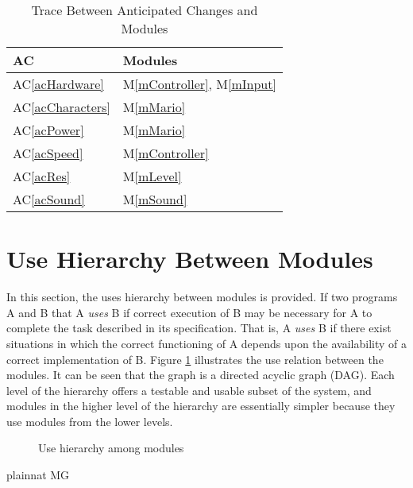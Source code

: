 \documentclass[12pt, titlepage]{article}
\newcommand{\acref}[1]{AC\ref{#1}}
\newcommand{\mref}[1]{M\ref{#1}}
\begin{document}
\begin{table}[H]
\centering
\begin{tabular}{p{} p{}}
\toprule
\textbf{AC} & \textbf{Modules}\\
\midrule
\acref{acHardware} & \mref{mController}, \mref{mInput}\\
\acref{acCharacters} & \mref{mMario}\\
\acref{acPower} & \mref{mMario}\\
\acref{acSpeed} & \mref{mController}\\
\acref{acRes} & \mref{mLevel}\\
\acref{acSound} & \mref{mSound}\\

\bottomrule
\end{tabular}
\caption{Trace Between Anticipated Changes and Modules}
\label{TblACT}
\end{table}

\section{Use Hierarchy Between Modules} \label{SecUse}

In this section, the uses hierarchy between modules is
provided. If two programs A and B that A {\em uses} B if
correct execution of B may be necessary for A to complete the task described in
its specification. That is, A {\em uses} B if there exist situations in which
the correct functioning of A depends upon the availability of a correct
implementation of B.  Figure \ref{FigUH} illustrates the use relation between
the modules. It can be seen that the graph is a directed acyclic graph
(DAG). Each level of the hierarchy offers a testable and usable subset of the
system, and modules in the higher level of the hierarchy are essentially simpler
because they use modules from the lower levels.

\begin{figure}[H]
\centering
\caption{Use hierarchy among modules}
\label{FigUH}
\end{figure}


 {plainnat}
 {MG}
\end{document}
